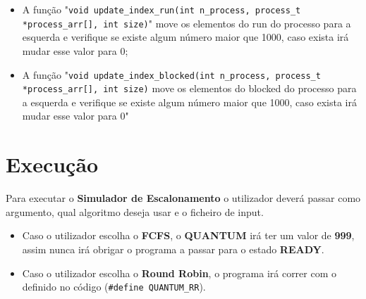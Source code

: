 \documentclass[11pt]{article}   %
\begin{document}
\begin{itemize}
\begin{itemize}
            \item A função "\verb|void update_index_run(int n_process, process_t *process_arr[], int size)|" \newline move os elementos do run do processo para a esquerda e verifique se existe algum número maior que 1000, caso exista irá mudar esse valor para 0;
            \item A função "\verb|void update_index_blocked(int n_process, process_t *process_arr[], int size)| \newline move os elementos do blocked do processo para a esquerda e verifique se existe algum número maior que 1000, caso exista irá mudar esse valor para 0"
        \end{itemize}
\end{itemize}

\section{Execução}

\hspace{0,5cm}Para executar o \textbf{Simulador de Escalonamento} o utilizador deverá passar como argumento, qual algoritmo deseja usar e o ficheiro de input.
\begin{itemize}
    \item Caso o utilizador escolha o \textbf{FCFS}, o \textbf{QUANTUM} irá ter um valor de \textbf{999}, assim nunca irá obrigar o programa a passar para o estado \textbf{READY}.
    \item Caso o utilizador escolha o \textbf{Round Robin}, o programa irá correr com o  definido no código (\verb|#define QUANTUM_RR|).
\end{itemize}
\end{document}
